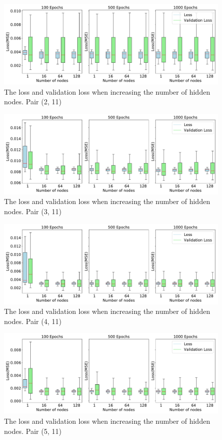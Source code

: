 	\begin{figure}[H]
		\centering
		\includegraphics[width=1\linewidth]{Pictures/Results/experiment_1_1_2}
		\caption{The loss and validation loss when increasing the number of hidden nodes. Pair (2, 11)}
		\label{fig:experiment_1_1_2}
	\end{figure}
	\begin{figure}[H]
		\centering
		\includegraphics[width=1\linewidth]{Pictures/Results/experiment_1_1_3}
		\caption{The loss and validation loss when increasing the number of hidden nodes. Pair (3, 11)}
		\label{fig:experiment_1_1_3}
	\end{figure}
	\begin{figure}[H]
		\centering
		\includegraphics[width=1\linewidth]{Pictures/Results/experiment_1_1_4}
		\caption{The loss and validation loss when increasing the number of hidden nodes. Pair (4, 11)}
		\label{fig:experiment_1_1_4}
	\end{figure}
	\begin{figure}[H]
		\centering
		\includegraphics[width=1\linewidth]{Pictures/Results/experiment_1_1_5}
		\caption{The loss and validation loss when increasing the number of hidden nodes. Pair (5, 11)}
		\label{fig:experiment_1_1_5}
	\end{figure}


